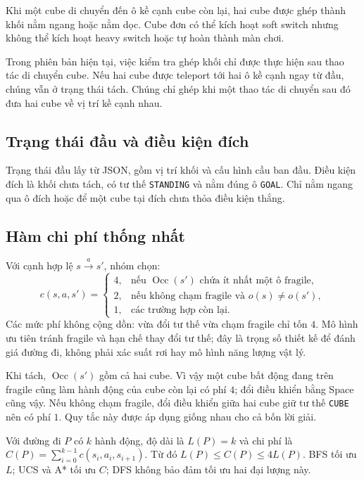 Khi một cube di chuyển đến ô kề cạnh cube còn lại, hai cube được ghép thành khối nằm ngang hoặc nằm dọc. Cube đơn có thể kích hoạt soft switch nhưng không thể kích hoạt heavy switch hoặc tự hoàn thành màn chơi.

Trong phiên bản hiện tại, việc kiểm tra ghép khối chỉ được thực hiện sau thao tác di chuyển cube. Nếu hai cube được teleport tới hai ô kề cạnh ngay từ đầu, chúng vẫn ở trạng thái tách. Chúng chỉ ghép khi một thao tác di chuyển sau đó đưa hai cube về vị trí kề cạnh nhau.

\subsection{Trạng thái đầu và điều kiện đích}
Trạng thái đầu lấy từ JSON, gồm vị trí khối và cấu hình cầu ban đầu. Điều kiện đích là khối chưa tách, có tư thế \texttt{STANDING} và nằm đúng ô \texttt{GOAL}. Chỉ nằm ngang qua ô đích hoặc để một cube tại đích chưa thỏa điều kiện thắng.

\subsection{Hàm chi phí thống nhất}
Với cạnh hợp lệ $s\xrightarrow{a}s'$, nhóm chọn:
\[
c(s,a,s')=\begin{cases}
4,&\text{nếu }\operatorname{Occ}(s')\text{ chứa ít nhất một ô fragile},\\
2,&\text{nếu không chạm fragile và }o(s)\ne o(s'),\\
1,&\text{các trường hợp còn lại.}
\end{cases}
\]
Các mức phí không cộng dồn: vừa đổi tư thế vừa chạm fragile chỉ tốn $4$. Mô hình ưu tiên tránh fragile và hạn chế thay đổi tư thế; đây là trọng số thiết kế để đánh giá đường đi, không phải xác suất rơi hay mô hình năng lượng vật lý.

Khi tách, $\operatorname{Occ}(s')$ gồm cả hai cube. Vì vậy một cube bất động đang trên fragile cũng làm hành động của cube còn lại có phí $4$; đổi điều khiển bằng Space cũng vậy. Nếu không chạm fragile, đổi điều khiển giữa hai cube giữ tư thế \texttt{CUBE} nên có phí $1$. Quy tắc này được áp dụng giống nhau cho cả bốn lời giải.

Với đường đi $P$ có $k$ hành động, độ dài là $L(P)=k$ và chi phí là $C(P)=\sum_{i=0}^{k-1}c(s_i,a_i,s_{i+1})$. Từ đó $L(P)\le C(P)\le4L(P)$. BFS tối ưu $L$; UCS và A* tối ưu $C$; DFS không bảo đảm tối ưu hai đại lượng này.
